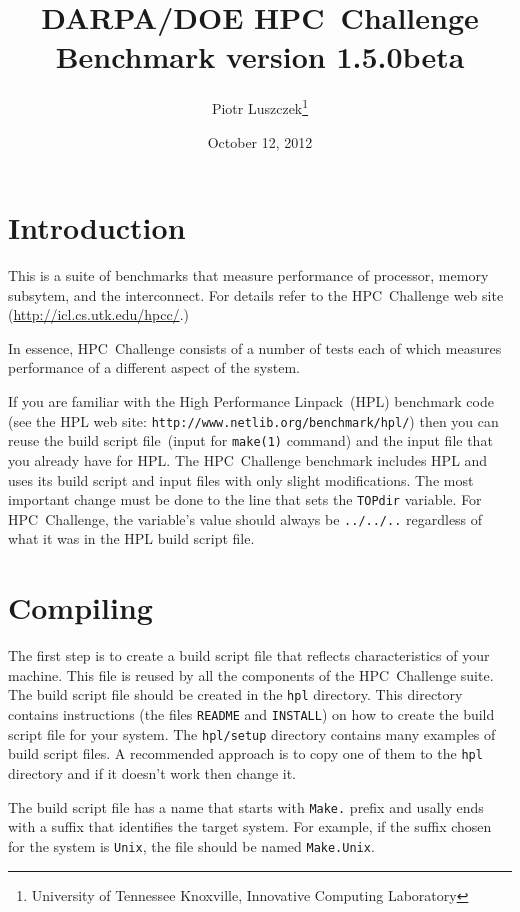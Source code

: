 \documentclass[twocolumn]{article}
\begin{document}
\title{DARPA/DOE HPC~Challenge Benchmark version 1.5.0beta}
\author{Piotr Luszczek\footnote{University of Tennessee Knoxville, Innovative
Computing Laboratory}}
\date{October 12, 2012}
\maketitle

\section{Introduction}
This is a suite of benchmarks that measure performance of processor,
memory subsytem, and the interconnect. For details refer to the
HPC~Challenge web site (\url{http://icl.cs.utk.edu/hpcc/}.)

In essence, HPC~Challenge consists of a number of tests each
of which measures performance of a different aspect of the system.

If you are familiar with the High Performance Linpack~(HPL) benchmark
code (see the HPL web site:
\texttt{http://www.netlib.org/benchmark/hpl/}) then you can reuse the
build script file~(input for \texttt{make(1)} command) and the input
file that you already have for HPL. The HPC~Challenge benchmark
includes HPL and uses its build script and input files with only
slight modifications. The most important change must be done to the
line that sets the \texttt{TOPdir} variable. For HPC~Challenge, the
variable's value should always be \texttt{../../..} regardless of what
it was in the HPL build script file.

\section{Compiling}
The first step is to create a build script file that reflects
characteristics of your machine. This file is reused by all the
components of the HPC~Challenge suite. The build script file should be
created in the \texttt{hpl} directory. This directory contains
instructions (the files \texttt{README} and \texttt{INSTALL}) on how
to create the build script file for your system. The
\texttt{hpl/setup} directory contains many examples of build script
files. A recommended approach is to copy one of them to the
\texttt{hpl} directory and if it doesn't work then change it.

The build script file has a name that starts with \texttt{Make.}
prefix and usally ends with a suffix that identifies the target
system. For example, if the suffix chosen for the system is
\texttt{Unix}, the file should be named \texttt{Make.Unix}.
\end{document}

